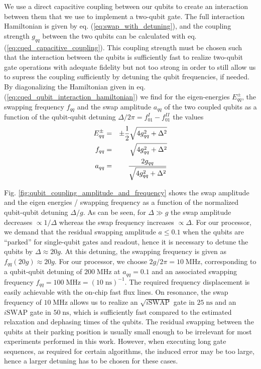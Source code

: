 We use a direct capacitive coupling between our qubits to create an interaction between them that we use to implement a two-qubit gate. The full interaction Hamiltonian is given by eq. (\ref{eq:swap_with_detuning}), and the coupling strength $g_{qq}$ between the two qubits can be calculated with eq. (\ref{eq:cqed_capacitive_coupling}). This coupling strength must be chosen such that the interaction between the qubits is sufficiently fast to realize two-qubit gate operations with adequate fidelity but not too strong in order to still allow us to supress the coupling sufficiently by detuning the qubit frequencies, if needed. By diagonalizing the Hamiltonian given in eq. (\ref{eq:cqed_qubit_interaction_hamiltonian}) we find for the eigen-energies $E_{qq}^\pm$, the swapping frequency $f_{qq}$ and the swap amplitude $a_{qq}$ of the two coupled qubits as a function of the qubit-qubit detuning $\Delta/2\pi=f_{01}^I-f_{01}^{II}$ the values
%
\begin{eqnarray}
E_{qq}^\pm & = & \pm\frac{1}{2}\sqrt{4g_{qq}^2+\Delta^2} \notag \\
f_{qq}     & = & \sqrt{4g_{qq}^2+\Delta^2} \notag \\
a_{qq}     & = & \frac{2g_{qq}}{\sqrt{4g_{qq}^2+\Delta^2}} \label{eq:qubit_coupling_amplitude_and_frequency}
\end{eqnarray}
%

Fig. \ref{fig:qubit_coupling_amplitude_and_frequency} shows the swap amplitude and the eigen energies / swapping frequency as a function of the normalized qubit-qubit detuning $\Delta/g$. As can be seen, for $\Delta \gg g$ the swap amplitude decreases $\propto 1/\Delta$ whereas the swap frequency increases $\propto \Delta$. For our processor, we demand that the residual swapping amplitude $a\le 0.1$ when the qubits are ``parked'' for single-qubit gates and readout, hence it is necessary to detune the qubits by $\Delta \approx 20 g$. At this detuning, the swapping frequency is given as $f_{qq}(20 g)\approx 20 g$. For our processor, we choose $2g/2\pi = 10\;\mathrm{MHz}$, corresponding to a qubit-qubit detuning of $200\;\mathrm{MHz}$ at $a_{qq}=0.1$ and an associated swapping frequency $f_{qq}=100\;\mathrm{MHz}=(10\;\mathrm{ns})^{-1}$. The required frequency displacement is easily achievable with the on-chip fast flux lines. On resonance, the swap frequency of $10\;\mathrm{MHz}$ allows us to realize an $\sqrt{i\mathrm{SWAP}}$ gate in $25\;\mathrm{ns}$ and an $i\mathrm{SWAP}$ gate in $50\;\mathrm{ns}$, which is sufficiently fast compared to the estimated relaxation and dephasing times of the qubits. The residual swapping between the qubits at their parking position is usually small enough to be irrelevant for most experiments performed in this work. However, when executing long gate sequences, as required for certain algorithms, the induced error may be too large, hence a larger detuning has to be chosen for these cases.


